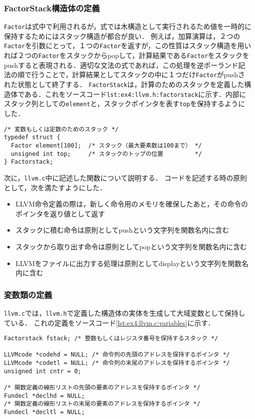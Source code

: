 \documentclass[uplatex]{jsarticle}
\begin{document}
\subsubsection{FactorStack構造体の定義}
\verb#Factor#は式中で利用されるが，式では木構造として実行されるため値を一時的に保持するためにはスタック構造が都合が良い．
例えば，加算演算は，２つの\verb#Factor#を引数にとって，１つの\verb#Factor#を返すが，この性質はスタック構造を用いれば２つの\verb#Factor#をスタックからpopして，計算結果である\verb#Factor#をスタックをpushすると表現される．適切な文法の式であれば，この処理を逆ポーランド記法の順で行うことで，計算結果としてスタックの中に１つだけ\verb#Factor#がpushされた状態として終了する．
\verb#FactorStack#は，計算のためのスタックを定義した構造体である．これをソースコード\verb#lst:ex4:llvm.h:factorstack#に示す．内部にスタック列としての\verb#element#と，スタックポインタを表す\verb#top#を保持するようにした．
\begin{lstlisting}[caption=FactorのスタックであるFactorStack,label=lst:ex4:llvm.h:factorstack]
/* 変数もしくは定数のためのスタック */
typedef struct {
  Factor element[100];  /* スタック（最大要素数は100まで） */
  unsigned int top;     /* スタックのトップの位置         */
} Factorstack;
\end{lstlisting}

次に，\verb#llvm.c#中に記述した関数について説明する．
コードを記述する時の原則として，次を満たすようにした．
\begin{itemize}
  \item{LLVM命令定義の際は，新しく命令用のメモリを確保したあと，その命令のポインタを返り値として返す}
  \item{スタックに積む命令は原則としてpushという文字列を関数名内に含む}
  \item{スタックから取り出す命令は原則としてpopという文字列を関数名内に含む}
  \item{LLVMをファイルに出力する処理は原則としてdisplayという文字列を関数名内に含む}
\end{itemize}

\subsubsection{変数類の定義}
\verb#llvm.c#では，\verb#llvm.h#で定義した構造体の実体を生成して大域変数として保持している．
これの定義をソースコード\ref{lst:ex4:llvm.c:variables}に示す．
\begin{lstlisting}[caption=コンパイラ中で利用した変数,label=lst:ex4:llvm.c:variables]
Factorstack fstack; /* 整数もしくはレジスタ番号を保持するスタック */

LLVMcode *codehd = NULL; /* 命令列の先頭のアドレスを保持するポインタ */
LLVMcode *codetl = NULL; /* 命令列の末尾のアドレスを保持するポインタ */
unsigned int cntr = 0;

/* 関数定義の線形リストの先頭の要素のアドレスを保持するポインタ */
Fundecl *declhd = NULL;
/* 関数定義の線形リストの末尾の要素のアドレスを保持するポインタ */
Fundecl *decltl = NULL;

\end{lstlisting}
\end{document}
